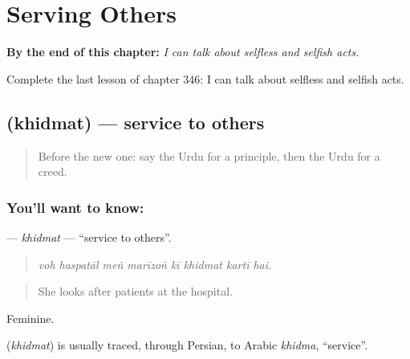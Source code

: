 
\chapter{Serving Others}
\label{ch:ur-serving-others}

\begin{chapteropening}
\textbf{By the end of this chapter:} \emph{I can talk about selfless and selfish acts.}

Complete the last lesson of chapter 346: I can talk about selfless and selfish acts.
\end{chapteropening}

\section[\texorpdfstring{\ur{خدمت} (khidmat)}{خدمت (khidmat)}]{ (khidmat) — service to others}

\label{lesson:UR-C346-khidmat}



\begin{quote}
Before the new one: say the Urdu for a principle, then the Urdu for a creed.
\end{quote}

\subsection*{You'll want to know: }
\textbf{} — \emph{khidmat} — \textquotedblleft{}service to others\textquotedblright{}.

\begin{quote}
       
\end{quote}

\begin{quote}
\emph{voh haspatāl meṅ marīzoṅ kī khidmat kartī hai.}
\end{quote}

\begin{quote}
She looks after patients at the hospital.
\end{quote}

Feminine.

\begin{cousinweb}
\textbf{} (\emph{khidmat}) is usually traced, through Persian, to Arabic \emph{khidma}, \textquotedblleft{}service\textquotedblright{}.
\end{cousinweb}


